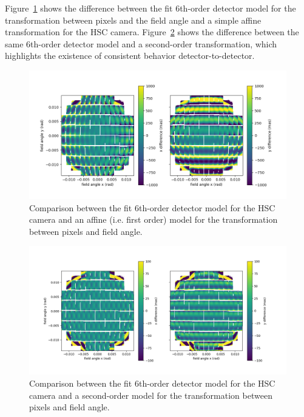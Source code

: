 \documentclass[DM,authoryear,toc]{lsstdoc}
\begin{document}
Figure~\ref{fig:cam order 1 comp} shows the difference between the fit 6th-order detector model for the transformation between pixels and the field angle and a simple affine transformation for the HSC camera. Figure~\ref{fig:cam order 2 comp} shows the difference between the same 6th-order detector model and a second-order transformation, which highlights the existence of consistent behavior detector-to-detector.
\begin{figure}
\includegraphics[width=\columnwidth]{figures/CameraOrder6_Order1_comp.png}
\caption{Comparison between the fit 6th-order detector model for the HSC camera and an affine (i.e. first order) model for the transformation between pixels and field angle.}
\label{fig:cam order 1 comp}
\end{figure}
\begin{figure}
\includegraphics[width=\columnwidth]{figures/CameraOrder6_Order2_comp.png}
\caption{Comparison between the fit  6th-order detector model for the HSC camera and a second-order model for the transformation between pixels and field angle.}
\label{fig:cam order 2 comp}
\end{figure}
\end{document}
